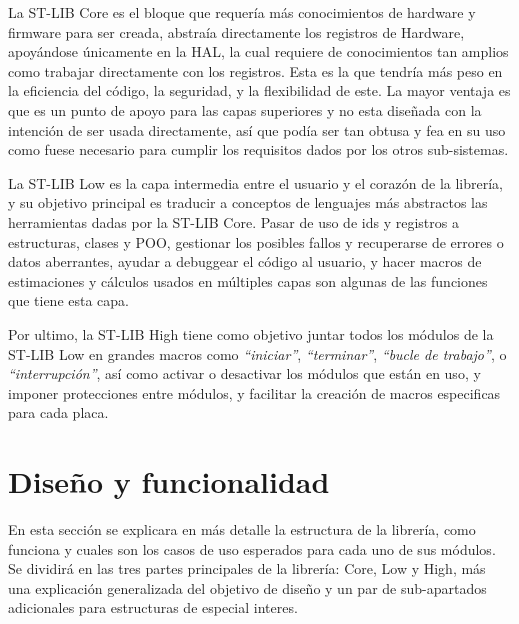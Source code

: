 \documentclass{report}
\begin{document}
La ST-LIB Core es el bloque que requería más conocimientos de hardware y firmware para ser creada, abstraía directamente los registros de Hardware, apoyándose únicamente en la HAL, la cual requiere de conocimientos tan amplios como trabajar directamente con los registros. Esta es la que tendría más peso en la eficiencia del código, la seguridad, y la flexibilidad de este. La mayor ventaja es que es un punto de apoyo para las capas superiores y no esta diseñada con la intención de ser usada directamente, así que podía ser tan obtusa y fea en su uso como fuese necesario para cumplir los requisitos dados por los otros sub-sistemas. \par
La ST-LIB Low es la capa intermedia entre el usuario y el corazón de la librería, y su objetivo principal es traducir a conceptos de lenguajes más abstractos las herramientas dadas por la ST-LIB Core. Pasar de uso de ids y registros a estructuras, clases y POO, gestionar los posibles fallos y recuperarse de errores o datos aberrantes, ayudar a debuggear el código al usuario, y hacer macros de estimaciones y cálculos usados en múltiples capas son algunas de las funciones que tiene esta capa. \par
Por ultimo, la ST-LIB High tiene como objetivo juntar todos los módulos de la ST-LIB Low en grandes macros como \textit{``iniciar''}, \textit{``terminar''}, \textit{``bucle de trabajo''}, o \textit{``interrupción''}, así como activar o desactivar los módulos que están en uso, y imponer protecciones entre módulos, y facilitar la creación de macros especificas para cada placa. 
\newpage

\section{Diseño y funcionalidad}
En esta sección se explicara en más detalle la estructura de la librería, como funciona y cuales son los casos de uso esperados para cada uno de sus módulos. Se dividirá en las tres partes principales de la librería: Core, Low y High, más una explicación generalizada del objetivo de diseño y un par de sub-apartados adicionales para estructuras de especial interes.  
\end{document}

